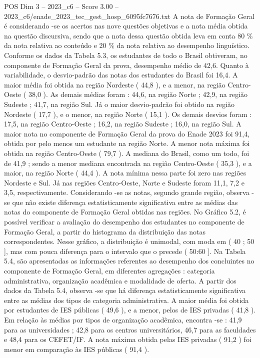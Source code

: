 \begin{textsample}{POS Dim 3 – 2023\_c6 – Score 3.00 – 2023\_c6/enade\_2023\_tec\_gest\_hosp\_6095fc7676.txt}
A nota de Formação Geral é considerando -se os acertos nas nove questões objetivas e a nota média obtida na questão discursiva, sendo que a nota dessa questão obtida leva em conta 80 \% da nota relativa ao conteúdo e 20 \% da nota relativa ao desempenho linguístico.
Conforme os dados da Tabela 5.3, os estudantes de todo o Brasil obtiveram, no componente de Formação Geral da prova, desempenho médio de 42,6.
Quanto à variabilidade, o desvio-padrão das notas dos estudantes do Brasil foi 16,4.
A maior média foi obtida na região Nordeste ( 44,8 ), e a menor, na região Centro-Oeste ( 38,0 ).
As demais médias foram : 44,6, na região Norte ; 42,9, na região Sudeste ; 41,7, na região Sul.
Já o maior desvio-padrão foi obtido na região Nordeste ( 17,7 ), e o menor, na região Norte ( 15,1 ).
Os demais desvios foram : 17,5, na região Centro-Oeste ; 16,2, na região Sudeste ; 16,0, na região Sul.
A maior nota no componente de Formação Geral da prova do Enade 2023 foi 91,4, obtida por pelo menos um estudante na região Norte.
A menor nota máxima foi obtida na região Centro-Oeste ( 79,7 ).
A mediana do Brasil, como um todo, foi de 41,9 ; sendo a menor mediana encontrada na região Centro-Oeste ( 35,3 ), e a maior, na região Norte ( 44,4 ).
A nota mínima nessa parte foi zero nas regiões Nordeste e Sul.
Já nas regiões Centro-Oeste, Norte e Sudeste foram 11,1, 7,2 e 3,5, respectivamente.
Considerando -se as notas, segundo grande região, observa -se que não existe diferença estatisticamente significativa entre as médias das notas do componente de Formação Geral obtidas nas regiões.
No Gráfico 5.2, é possível verificar a avaliação do desempenho dos estudantes no componente de Formação Geral, a partir do histograma da distribuição das notas correspondentes.
Nesse gráfico, a distribuição é unimodal, com moda em ( 40 ; 50 ], mas com pouca diferença para o intervalo que o precede ( 50:60 ].
Na Tabela 5.4, são apresentadas as informações referentes ao desempenho dos concluintes no componente de Formação Geral, em diferentes agregações : categoria administrativa, organização acadêmica e modalidade de oferta.
A partir dos dados da Tabela 5.4, observa -se que há diferença estatisticamente significativa entre as médias dos tipos de categoria administrativa.
A maior média foi obtida por estudantes de IES públicas ( 49,6 ), e a menor, pelos de IES privadas ( 41,8 ).
Em relação às médias por tipos de organização acadêmica, encontra -se : 41,9 para as universidades ; 42,8 para os centros universitários, 46,7 para as faculdades e 48,4 para os CEFET/IF.
A nota máxima obtida pelas IES privadas ( 91,2 ) foi menor em comparação às IES públicas ( 91,4 ).

\end{textsample}

